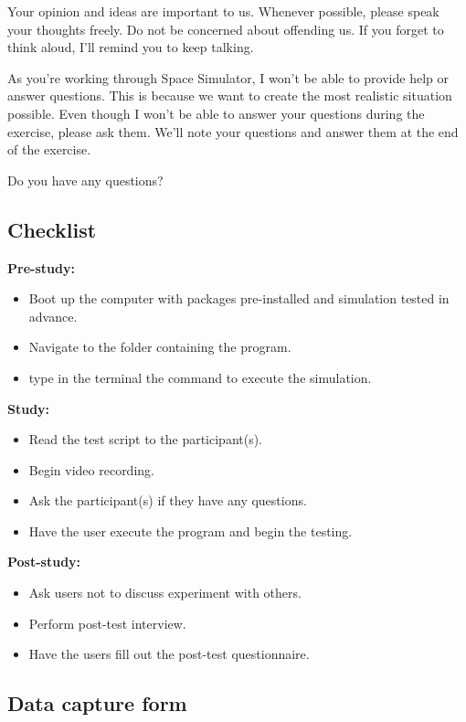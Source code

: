 Your opinion and ideas are important to us.  Whenever possible, please speak your thoughts freely.  Do not be concerned about offending us.  If you forget to think aloud, I'll remind you to keep talking. 
    
As you’re working through Space Simulator, I won’t be able to provide help or answer questions.  This is because we want to create the most realistic situation possible.  Even though I won't be able to answer your questions during the exercise, please ask them. We'll note your questions and answer them at the end of the exercise. 
     
Do you have any questions? 

\subsection{Checklist}

\noindent
\textbf{Pre-study:}
\begin{itemize}
  \item Boot up the computer with packages pre-installed and simulation tested in advance.
  \item Navigate to the folder containing the program.
  \item type in the terminal the command to execute the simulation.
\end{itemize}

\noindent
\textbf{Study:}
\begin{itemize}
  \item Read the test script to the participant(s).
  \item Begin video recording.
  \item Ask the participant(s) if they have any questions.
  \item Have the user execute the program and begin the testing.
\end{itemize}

\noindent
\textbf{Post-study:}
\begin{itemize}
  \item Ask users not to discuss experiment with others.
  \item Perform post-test interview.
  \item Have the users fill out the post-test questionnaire.
\end{itemize}

\subsection{Data capture form}

